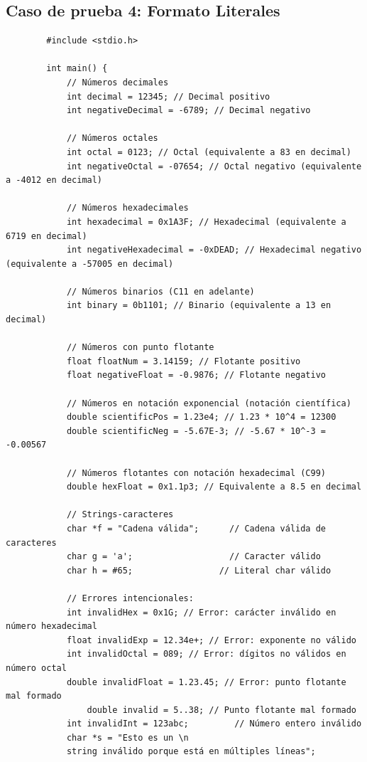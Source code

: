\documentclass[a4paper,12pt]{article}
\begin{document}
\newpage

\subsection*{Caso de prueba 4: Formato Literales}
\begin{flushleft}
	\begin{verbatim}
		#include <stdio.h>
		
		int main() {
			// Números decimales
			int decimal = 12345; // Decimal positivo
			int negativeDecimal = -6789; // Decimal negativo
			
			// Números octales
			int octal = 0123; // Octal (equivalente a 83 en decimal)
			int negativeOctal = -07654; // Octal negativo (equivalente a -4012 en decimal)
			
			// Números hexadecimales
			int hexadecimal = 0x1A3F; // Hexadecimal (equivalente a 6719 en decimal)
			int negativeHexadecimal = -0xDEAD; // Hexadecimal negativo (equivalente a -57005 en decimal)
			
			// Números binarios (C11 en adelante)
			int binary = 0b1101; // Binario (equivalente a 13 en decimal)
			
			// Números con punto flotante
			float floatNum = 3.14159; // Flotante positivo
			float negativeFloat = -0.9876; // Flotante negativo
			
			// Números en notación exponencial (notación científica)
			double scientificPos = 1.23e4; // 1.23 * 10^4 = 12300
			double scientificNeg = -5.67E-3; // -5.67 * 10^-3 = -0.00567
			
			// Números flotantes con notación hexadecimal (C99)
			double hexFloat = 0x1.1p3; // Equivalente a 8.5 en decimal
			
			// Strings-caracteres
			char *f = "Cadena válida";      // Cadena válida de caracteres
			char g = 'a';                   // Caracter válido
			char h = #65;                 // Literal char válido
			
			// Errores intencionales:
			int invalidHex = 0x1G; // Error: carácter inválido en número hexadecimal
			float invalidExp = 12.34e+; // Error: exponente no válido
			int invalidOctal = 089; // Error: dígitos no válidos en número octal
			double invalidFloat = 1.23.45; // Error: punto flotante mal formado
			    double invalid = 5..38; // Punto flotante mal formado
			int invalidInt = 123abc;         // Número entero inválido
			char *s = "Esto es un \n
			string inválido porque está en múltiples líneas";           
			

\end{verbatim}
\end{flushleft}
\end{document}
